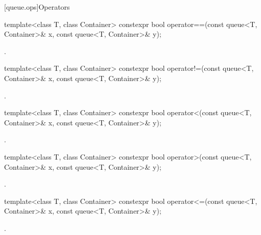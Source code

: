 [queue.ops]{Operators}

%
\begin{itemdecl}
template<class T, class Container>
  constexpr bool operator==(const queue<T, Container>& x, const queue<T, Container>& y);
\end{itemdecl}

\begin{itemdescr}
\pnum
\returns
{}.
\end{itemdescr}

%
\begin{itemdecl}
template<class T, class Container>
  constexpr bool operator!=(const queue<T, Container>& x,  const queue<T, Container>& y);
\end{itemdecl}

\begin{itemdescr}
\pnum
\returns
{}.
\end{itemdescr}

%
\begin{itemdecl}
template<class T, class Container>
  constexpr bool operator<(const queue<T, Container>& x, const queue<T, Container>& y);
\end{itemdecl}

\begin{itemdescr}
\pnum
\returns
{}.
\end{itemdescr}

%
\begin{itemdecl}
template<class T, class Container>
  constexpr bool operator>(const queue<T, Container>& x, const queue<T, Container>& y);
\end{itemdecl}

\begin{itemdescr}
\pnum
\returns
{}.
\end{itemdescr}

%
\begin{itemdecl}
template<class T, class Container>
  constexpr bool operator<=(const queue<T, Container>& x, const queue<T, Container>& y);
\end{itemdecl}

\begin{itemdescr}
\pnum
\returns
{}.
\end{itemdescr}

